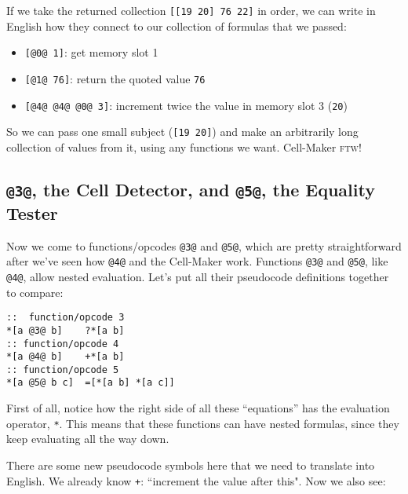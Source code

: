 \documentclass[twoside]{article}
\begin{document}
If we take the returned collection \lstinline[style=inlinecode]{[[19 20] 76 22]} in order, we can write in English how they connect to our collection of formulas that we passed:

\begin{itemize}
  \item  \lstinline[style=inlinecode]{[@0@ 1]}: get memory slot 1
  \item  \lstinline[style=inlinecode]{[@1@ 76]}: return the quoted value \lstinline[style=inlinecode]{76}
  \item  \lstinline[style=inlinecode]{[@4@ @4@ @0@ 3]}: increment twice the value in memory slot 3 (\lstinline[style=inlinecode]{20})
\end{itemize}

So we can pass one small subject (\lstinline[style=inlinecode]{[19 20]}) and make an arbitrarily long collection of values from it, using any functions we want. Cell-Maker \textsc{ftw}!

\subsection{\lstinline[style=inlinecode]{@3@}, the Cell Detector, and \lstinline[style=inlinecode]{@5@}, the Equality Tester}

Now we come to functions/opcodes \lstinline[style=inlinecode]{@3@} and \lstinline[style=inlinecode]{@5@}, which are pretty straightforward after we've seen how \lstinline[style=inlinecode]{@4@} and the Cell-Maker work. Functions \lstinline[style=inlinecode]{@3@} and \lstinline[style=inlinecode]{@5@}, like \lstinline[style=inlinecode]{@4@}, allow nested evaluation. Let's put all their pseudocode definitions together to compare:

\begin{lstlisting}[style=listingcode]
::  function/opcode 3
*[a @3@ b]    ?*[a b]
:: function/opcode 4
*[a @4@ b]    +*[a b]
:: function/opcode 5
*[a @5@ b c]  =[*[a b] *[a c]]
\end{lstlisting}

First of all, notice how the right side of all these “equations” has the evaluation operator, \lstinline[style=inlinecode]{*}. This means that these functions can have nested formulas, since they keep evaluating all the way down.

There are some new pseudocode symbols here that we need to translate into English. We already know \lstinline[style=inlinecode]{+}: ``increment the value after this". Now we also see:
\end{document}
